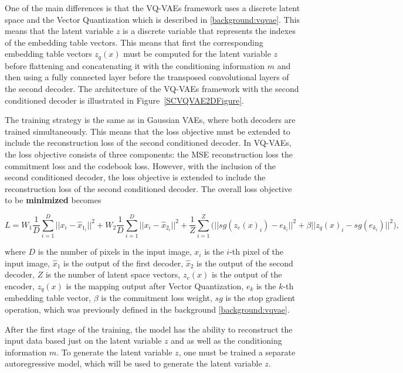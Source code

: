 One of the main differences is that the VQ-VAEs framework uses a discrete
latent space and the Vector Quantization which is described in \autoref{background:vqvae}. This means that the latent variable $z$ is a discrete variable that represents the indexes of the embedding table vectors. This means that first the corresponding embedding table vectors $z_q(x)$ must be computed for the latent variable $z$ before flattening and concatenating it with the conditioning information $m$ and then using a fully connected layer before the transposed convolutional layers of the second decoder. The architecture of the VQ-VAEs framework with the second conditioned decoder is illustrated in Figure~\ref{SCVQVAE2DFigure}.

The training strategy is the same as in Gaussian VAEs, where both decoders are trained simultaneously. This means that the loss objective must be extended to include the reconstruction loss of the second conditioned decoder. In VQ-VAEs, the loss objective consists of three components: the MSE
reconstruction loss the commitment loss and the codebook loss. However,
with the inclusion of the second conditioned decoder, the loss objective is
extended to include the reconstruction loss of the second conditioned decoder.
The overall loss objective to be \textbf{minimized} becomes

\[ L = W_1 \frac{1}{D} \sum_{i=1}^{D} ||x_i - \hat{x}_{1_{i}} ||^2 +  W_2 \frac{1}{D} \sum_{i=1}^{D} || x_i - \hat{x}_{2_{i}} ||^2 + \frac{1}{Z} \sum_{i=1}^{Z} \biggl( || sg(z_e(x)_i) - e_{k_i} ||^2 + \beta || z_q(x)_i - sg(e_{k{_i}}) ||^2 \biggr) , \]


where $D$ is the number of pixels in the input image, $x_i$ is the $i$-th pixel
of the input image, $\hat{x}_1$ is the output of the first decoder, $\hat{x}_2$
is the output of the second decoder, $Z$ is the number of latent space vectors,
$z_e(x)$ is the output of the encoder, $z_q(x)$ is the mapping output after
Vector Quantization, $e_k$ is the $k$-th embedding table vector, $\beta$ is the
commitment loss weight, $sg$ is the stop gradient operation, which was
previously defined in the background \autoref{background:vqvae}.

After the first stage of the training, the model has the ability to reconstruct
the input data based just on the latent variable $z$ and as well as the
conditioning information $m$. To generate the latent variable $z$, one must be
trained a separate autoregressive model, which will be used to generate the
latent variable $z$.

